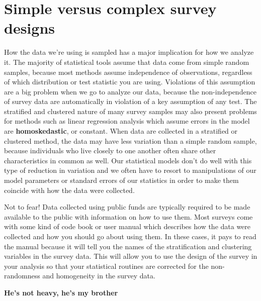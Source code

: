\documentclass[
  letterpaper,
  DIV=11,
  numbers=noendperiod]{scrreprt}
\begin{document}
\hypertarget{simple-versus-complex-survey-designs}{%
\section{Simple versus complex survey
designs}\label{simple-versus-complex-survey-designs}}

How the data we're using is sampled has a major implication for how we
analyze it. The majority of statistical tools assume that data come from
simple random samples, because most methods assume independence of
observations, regardless of which distribution or test statistic you are
using. Violations of this assumption are a big problem when we go to
analyze our data, because the non-independence of survey data are
automatically in violation of a key assumption of any test. The
stratified and clustered nature of many survey samples may also present
problems for methods such as linear regression analysis which assume
errors in the model are \textbf{homoskedastic}, or constant. When data
are collected in a stratified or clustered method, the data may have
less variation than a simple random sample, because individuals who live
closely to one another often share other characteristics in common as
well. Our statistical models don't do well with this type of reduction
in variation and we often have to resort to manipulations of our model
parameters or standard errors of our statistics in order to make them
coincide with how the data were collected.

Not to fear! Data collected using public funds are typically required to
be made available to the public with information on how to use them.
Most surveys come with some kind of code book or user manual which
describes how the data were collected and how you should go about using
them. In these cases, it pays to read the manual because it will tell
you the names of the stratification and clustering variables in the
survey data. This will allow you to use the design of the survey in your
analysis so that your statistical routines are corrected for the
non-randomness and homogeneity in the survey data.

\textbf{He's not heavy, he's my brother}
\end{document}
